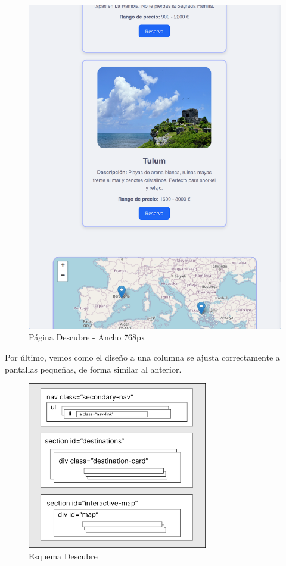 \documentclass[11pt, a4paper]{book}
\begin{document}
	\begin{figure} [H]
		\centering
		\includegraphics[height=0.4\textheight]{CSS/4-6 768.png}
		\caption{Página Descubre - Ancho 768px}
	\end{figure}

	Por último, vemos como el diseño a una columna se ajusta correctamente a pantallas pequeñas, de forma similar al anterior. 

	\begin{figure} [H]
		\centering
		\includegraphics[width=0.7\textwidth]{CSS/CSS Descubre.jpg}
		\caption{Esquema Descubre}
	\end{figure}
	
\end{document}
